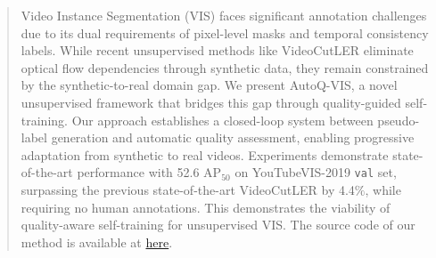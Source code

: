 \begin{abstract}

Video Instance Segmentation (VIS) faces significant annotation challenges due to its dual requirements of pixel-level masks and temporal consistency labels. While recent unsupervised methods like VideoCutLER eliminate optical flow dependencies through synthetic data, they remain constrained by the synthetic-to-real domain gap. We present AutoQ-VIS, a novel unsupervised framework that bridges this gap through quality-guided self-training. Our approach establishes a closed-loop system between pseudo-label generation and automatic quality assessment, enabling progressive adaptation from synthetic to real videos. Experiments demonstrate state-of-the-art performance with 52.6 $\text{AP}_{50}$ on YouTubeVIS-2019 \texttt{val} set, surpassing the previous state-of-the-art VideoCutLER by 4.4$\%$, while requiring no human annotations. This demonstrates the viability of quality-aware self-training for unsupervised VIS.
%
The source code of our method is available at \href{https://github.com/wcbup/AutoQ-VIS}{here}.

\end{abstract}
